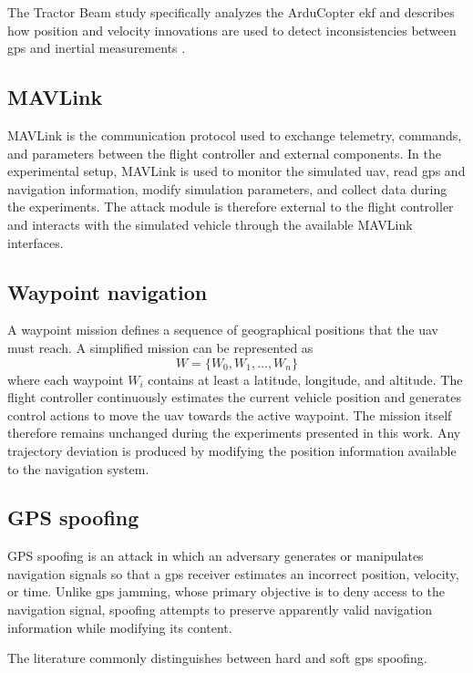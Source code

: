 The Tractor Beam study specifically analyzes the ArduCopter \gls{ekf} and describes how position and velocity innovations are used to detect inconsistencies between \gls{gps} and inertial measurements \cite{noh2019tractorbeam}.

\subsection{MAVLink}
MAVLink is the communication protocol used to exchange telemetry, commands, and parameters between the flight controller and external components.
In the experimental setup, MAVLink is used to monitor the simulated \gls{uav}, read \gls{gps} and navigation information, modify simulation parameters, and collect data during the experiments.
The attack module is therefore external to the flight controller and interacts with the simulated vehicle through the available MAVLink interfaces. 

\subsection{Waypoint navigation}
A waypoint mission defines a sequence of geographical positions that the \gls{uav} must reach.
A simplified mission can be represented as
\begin{equation} 
    W = \{W_0, W_1, \ldots, W_n\} 
\end{equation} 
where each waypoint $W_i$ contains at least a latitude, longitude, and altitude.
The flight controller continuously estimates the current vehicle position and generates control actions to move the \gls{uav} towards the active waypoint.
The mission itself therefore remains unchanged during the experiments presented in this work.
Any trajectory deviation is produced by modifying the position information available to the navigation system. 

\subsection{GPS spoofing}
GPS spoofing is an attack in which an adversary generates or manipulates navigation signals so that a \gls{gps} receiver estimates an incorrect position, velocity, or time.
Unlike \gls{gps} jamming, whose primary objective is to deny access to the navigation signal, spoofing attempts to preserve apparently valid navigation information while modifying its content.

The literature commonly distinguishes between hard and soft \gls{gps} spoofing.


